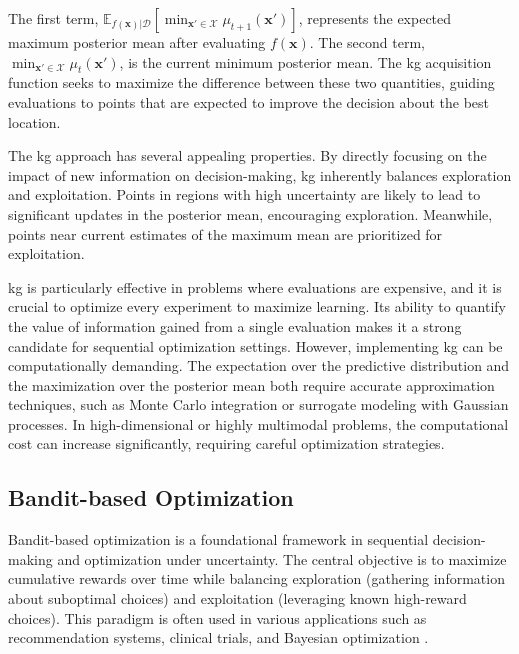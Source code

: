 The first term, $\mathbb{E}_{f(\mathbf{x}) \vert \mathcal{D}} \left[ \min_{\mathbf{x}' \in \mathcal{X}} \mu_{t+1}(\mathbf{x}') \right]$, represents the expected maximum posterior mean after evaluating $f(\mathbf{x})$. The second term, $\min_{\mathbf{x}' \in \mathcal{X}} \mu_t(\mathbf{x}')$, is the current minimum posterior mean. The \ac{kg} acquisition function seeks to maximize the difference between these two quantities, guiding evaluations to points that are expected to improve the decision about the best location.

The \ac{kg} approach has several appealing properties. By directly focusing on the impact of new information on decision-making, \ac{kg} inherently balances exploration and exploitation. Points in regions with high uncertainty are likely to lead to significant updates in the posterior mean, encouraging exploration. Meanwhile, points near current estimates of the maximum mean are prioritized for exploitation.

\ac{kg} is particularly effective in problems where evaluations are expensive, and it is crucial to optimize every experiment to maximize learning. Its ability to quantify the value of information gained from a single evaluation makes it a strong candidate for sequential optimization settings. However, implementing \ac{kg} can be computationally demanding. The expectation over the predictive distribution and the maximization over the posterior mean both require accurate approximation techniques, such as Monte Carlo integration or surrogate modeling with Gaussian processes. In high-dimensional or highly multimodal problems, the computational cost can increase significantly, requiring careful optimization strategies.

\subsection{Bandit-based Optimization}
Bandit-based optimization is a foundational framework in sequential decision-making and optimization under uncertainty. The central objective is to maximize cumulative rewards over time while balancing exploration (gathering information about suboptimal choices) and exploitation (leveraging known high-reward choices). This paradigm is often used in various applications such as recommendation systems, clinical trials, and Bayesian optimization \citep{lattimore2020bandit, bubeck2012regret}.

